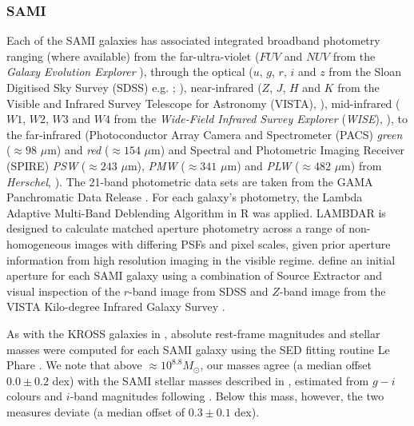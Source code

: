 \documentclass[a4paper,fleqn,usenatbib]{mnras}
\begin{document}
\subsubsection{SAMI}
\label{subsubsec:SAMIphot}

Each of the SAMI galaxies has associated integrated broadband photometry ranging (where available) from the far-ultra-violet ($FUV$ and $NUV$ from the {\it Galaxy Evolution Explorer} \citep[{\it GALEX};][]{Martin:2005}), through the optical ($u$, $g$, $r$, $i$ and $z$ from the Sloan Digitised Sky Survey (SDSS) e.g. \citealt{Stoughton:2002}; \citealt{Abazajian:2003}), near-infrared ($Z$, $J$, $H$ and $K$ from the Visible and Infrared Survey Telescope for Astronomy (VISTA), \citealt{Sutherland:2015}), mid-infrared ($W1$, $W2$, $W3$ and $W4$ from the {\it Wide-Field Infrared Survey Explorer} ({\it WISE}), \citealt{Wright:2010}), to the far-infrared (Photoconductor Array Camera and Spectrometer (PACS) {\it green} ($\approx98$ $\mu$m) and {\it red} ($\approx154$ $\mu$m) and Spectral and Photometric Imaging Receiver (SPIRE) {\it PSW} ($\approx243$ $\mu$m), {\it PMW}  ($\approx341$ $\mu$m) and {\it PLW}  ($\approx482$ $\mu$m) from {\it Herschel}, \citealt{Pilbratt:2010}). The 21-band photometric data sets are taken from the GAMA Panchromatic Data Release \citep[PDR;][]{Driver:2016}. For each galaxy's photometry, the Lambda Adaptive Multi-Band Deblending Algorithm in R \citep[LAMBDAR;][]{Wright:2016} was applied. LAMBDAR is designed to calculate matched aperture photometry across a range of non-homogeneous images with differing PSFs and pixel scales, given prior aperture information from high resolution imaging in the visible regime. \citeauthor{Wright:2016} define an initial aperture for each SAMI galaxy using a combination of Source Extractor \citep[SExtractor;][]{Bertin:1996} and visual inspection of the $r$-band image from SDSS and $Z$-band image from the VISTA Kilo-degree Infrared Galaxy Survey \citep[VIKING;][]{Edge:2013}. 

As with the KROSS galaxies in \citet{Tiley:2016}, absolute rest-frame magnitudes and stellar masses were computed for each SAMI galaxy using the SED fitting routine {\sc Le Phare} \citep[][]{Arnouts:1999,Ilbert:2006}. We note that above $\approx10^{8.8}M_{\odot}$, our masses agree (a median offset $0.0 \pm 0.2$ dex) with the SAMI stellar masses described in \citet{Bryant:2015}, estimated from $g-i$ colours and $i$-band magnitudes following \citet{Taylor:2011}. Below this mass, however, the two measures deviate (a median offset of $0.3 \pm 0.1$ dex).
\end{document}
